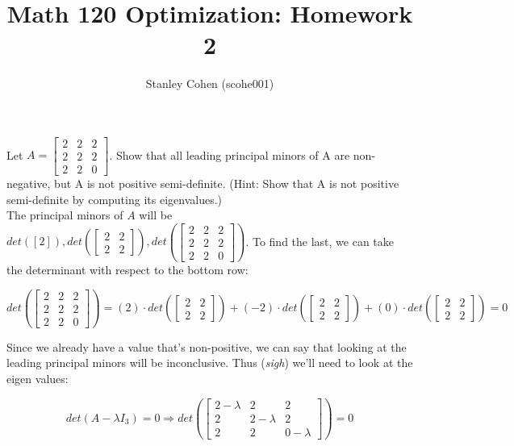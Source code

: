 \documentclass[12pt]{extarticle}
\title{Math 120 Optimization: Homework 2}
\author{Stanley Cohen (scohe001)}
\date{}
\theoremstyle{definition}
\begin{document}
\maketitle

\begin{problem}
	Let $A=\begin{bmatrix}
	2&2&2\\2&2&2\\2&2&0
	\end{bmatrix}$. Show that all leading principal minors of A are non-negative, but A is not positive semi-definite. 
	(Hint: Show that A is not positive semi-definite by computing its eigenvalues.)\\

	The principal minors of $A$ will be $det([2]), det(\begin{bmatrix} 2 & 2\\ 2 & 2 \end{bmatrix}), 
	det(\begin{bmatrix}2&2&2\\2&2&2\\2&2&0\end{bmatrix})$. To find the last, we can take the determinant with respect to the bottom row:

	$$det(\begin{bmatrix}2&2&2\\2&2&2\\2&2&0\end{bmatrix}) = (2)\cdot det(\begin{bmatrix}2&2\\2&2\end{bmatrix}) 
	+ (-2)\cdot det(\begin{bmatrix}2&2\\2&2\end{bmatrix}) + (0)\cdot det(\begin{bmatrix}2&2\\2&2\end{bmatrix}) = 0$$

	Since we already have a value that's non-positive, we can say that looking at the leading principal minors will 
	be inconclusive. Thus (\textit{sigh}) we'll need to look at the eigen values:

	$$det(A-\lambda I_3)=0 \Longrightarrow det(\begin{bmatrix}2-\lambda&2&2\\2&2-\lambda&2\\2&2&0-\lambda\end{bmatrix})={0}$$
	

\end{problem}
\end{document}
